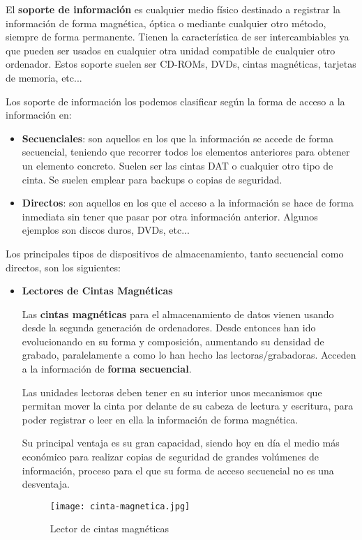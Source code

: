 \begin{itemize}
    El \textbf{soporte de información} es cualquier medio físico destinado a registrar la información de forma magnética, óptica o mediante cualquier otro método, siempre de forma permanente. Tienen la característica de ser intercambiables ya que pueden ser usados en cualquier otra unidad compatible de cualquier otro ordenador. Estos soporte suelen ser CD-ROMs, DVDs, cintas magnéticas, tarjetas de memoria, etc...

    Los soporte de información los podemos clasificar según la forma de acceso a la información en:
    \begin{itemize}
        \item \textbf{Secuenciales}: son aquellos en los que la información se accede de forma secuencial, teniendo que recorrer todos los elementos anteriores para obtener un elemento concreto. Suelen ser las cintas DAT o cualquier otro tipo de cinta. Se suelen emplear para backups o copias de seguridad.
        \item \textbf{Directos}: son aquellos en los que el acceso a la información se hace de forma inmediata sin tener que pasar por otra información anterior. Algunos ejemplos son discos duros, DVDs, etc...
    \end{itemize}

    Los principales tipos de dispositivos de almacenamiento, tanto secuencial como directos, son los siguientes:

    \begin{itemize}
        \item \textbf{Lectores de Cintas Magnéticas}

        Las \textbf{cintas magnéticas} para el almacenamiento de datos vienen usando desde la segunda generación de ordenadores. Desde entonces han ido evolucionando en su forma y composición, aumentando su densidad de grabado, paralelamente a como lo han hecho las lectoras/grabadoras. Acceden a la información de \textbf{forma secuencial}.

        Las unidades lectoras deben tener en su interior unos mecanismos que permitan mover la cinta por delante de su cabeza de lectura y escritura, para poder registrar o leer en ella la información de forma magnética.

        Su principal ventaja es su gran capacidad, siendo hoy en día el medio más económico para realizar copias de seguridad de grandes volúmenes de información, proceso para el que su forma de acceso secuencial no es una desventaja.

        \begin{figure}[ht]
            \centering
            \texttt{[image: cinta-magnetica.jpg]}
            \caption{Lector de cintas magnéticas}
        \end{figure}


\end{itemize}
\end{itemize}
